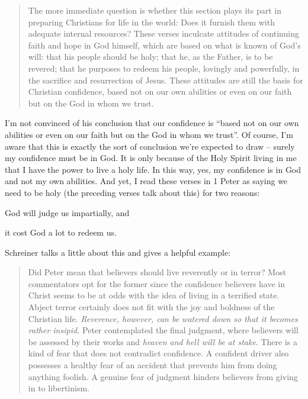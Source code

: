 \begin{quote}
    The more immediate question is whether this section plays its part in
    preparing Christians for life in the world: Does it furnish them with
    adequate internal resources? These verses inculcate attitudes of continuing
    faith and hope in God himself, which are based on what is known of God's
    will: that his people should be holy; that he, as the Father, is to be
    revered; that he purposes to redeem his people, lovingly and powerfully, in
    the sacrifice and resurrection of Jesus. These attitudes are still the basis
    for Christian confidence, based not on our own abilities or even on our
    faith but on the God in whom we trust.
    \autocite[Fear and Faith]{marshall:1991}
\end{quote}

I'm not convinced of his conclusion that our confidence is \enquote{based not on
our own abilities or even on our faith but on the God in whom we trust}. Of
course, I'm aware that this is exactly the sort of conclusion we're expected to
draw -- surely my confidence must be in God. It is only because of the Holy
Spirit living in me that I have the power to live a holy life. In this way, yes,
my confidence is in God and not my own abilities. And yet, I read these verses
in 1 Peter as saying we need to be holy (the preceding verses talk about this)
for two reasons: \begin{inparaenum}[(1)]
\item God will judge us impartially, and
\item it cost God a lot to redeem us.
\end{inparaenum}

Schreiner talks a little about this and gives a helpful example:

\begin{quote}
    Did Peter mean that believers should live reverently or in terror? Most
    commentators opt for the former since the confidence believers have in
    Christ seems to be at odds with the idea of living in a terrified state.
    Abject terror certainly does not fit with the joy and boldness of the
    Christian life. \emph{Reverence, however, can be watered down so that it
    becomes rather insipid.} Peter contemplated the final judgment, where
    believers will be assessed by their works and \emph{heaven and hell will be
    at stake}. There is a kind of fear that does not contradict confidence. A
    confident driver also possesses a healthy fear of an accident that prevents
    him from doing anything foolish. A genuine fear of judgment hinders
    believers from giving in to libertinism.
    \autocite[81, emphasis mine]{schreiner:2003}
\end{quote}

